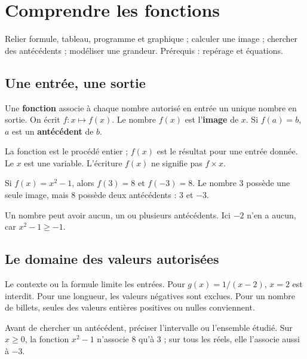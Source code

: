 \documentclass[../cours_3e.tex]{subfiles}
\begin{document}
\setcounter{chapter}{7}
\chapter{Comprendre les fonctions}
\label{ch:fonctions}
\begin{objectif}
Relier formule, tableau, programme et graphique ; calculer une image ; chercher des antécédents ; modéliser une grandeur. Prérequis : repérage et équations.
\end{objectif}
\section{Une entrée, une sortie}
\begin{definition}
Une \textbf{fonction} associe à chaque nombre autorisé en entrée un unique nombre en sortie. On écrit $f:x\mapsto f(x)$. Le nombre $f(x)$ est l'\textbf{image} de $x$. Si $f(a)=b$, $a$ est un \textbf{antécédent} de $b$.
\end{definition}
La fonction est le procédé entier ; $f(x)$ est le résultat pour une entrée donnée. Le $x$ est une variable. L'écriture $f(x)$ ne signifie pas $f\times x$.
\begin{exemple}
Si $f(x)=x^2-1$, alors $f(3)=8$ et $f(-3)=8$. Le nombre $3$ possède une seule image, mais $8$ possède deux antécédents : $3$ et $-3$.
\end{exemple}
Un nombre peut avoir aucun, un ou plusieurs antécédents. Ici $-2$ n'en a aucun, car $x^2-1\geq-1$.
\section{Le domaine des valeurs autorisées}
Le contexte ou la formule limite les entrées. Pour $g(x)=1/(x-2)$, $x=2$ est interdit. Pour une longueur, les valeurs négatives sont exclues. Pour un nombre de billets, seules des valeurs entières positives ou nulles conviennent.
\begin{attention}
Avant de chercher un antécédent, préciser l'intervalle ou l'ensemble étudié. Sur $x\geq0$, la fonction $x^2-1$ n'associe $8$ qu'à $3$ ; sur tous les réels, elle l'associe aussi à $-3$.
\end{attention}
\end{document}
